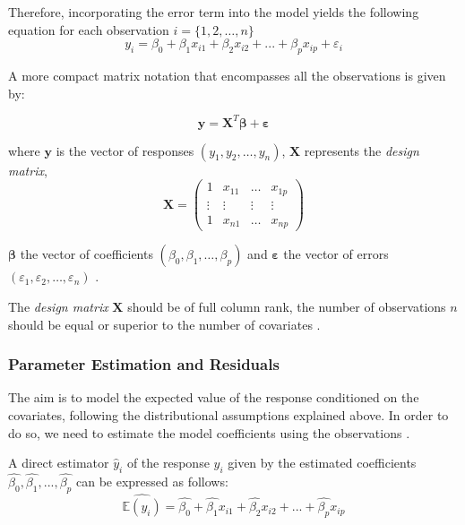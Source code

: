 \documentclass[12 pt]{scrartcl}
\numberwithin{equation}{section}
\begin{document}
Therefore, incorporating the error term into the model yields the following equation for each observation $i=\{1, 2,\hdots,n\}$
\begin{equation}
    y_{i} = \beta_{0} + \beta_{1}x_{i1} + \beta_{2}x_{i2} + ... + \beta_{p}x_{ip} + \varepsilon_{i}
\end{equation}

A more compact matrix notation that encompasses all the observations is given by:

\begin{equation}
    \boldsymbol{y} = \boldsymbol{X}^T\boldsymbol{\beta} + \boldsymbol{\varepsilon}
\end{equation}

where $\boldsymbol{y}$ is the vector of responses $(y_{1}, y_{2},\hdots,y_{n})$,
$\boldsymbol{X}$ represents the \textit{design matrix},
\begin{equation*}
    \boldsymbol{X} = \begin{pmatrix} 
        1 & x_{11} & \dots & x_{1p}\\
        \vdots & \vdots & \vdots & \vdots \\
        1 & x_{n1} & \dots & x_{np} 
        \end{pmatrix}
\end{equation*}

$\boldsymbol{\beta}$ the vector of coefficients $(\beta_{0},\beta_{1},\hdots,\beta_{p})$ 
and $\boldsymbol{\varepsilon}$ the vector of errors $(\varepsilon_{1}, \varepsilon_{2},\hdots,\varepsilon_{n})$ .

    
The \textit{design matrix} $\boldsymbol{X}$ should be of full column rank,
the number of observations $n$ should be equal or superior to the number of covariates \cite[p.75]{regression}.


\subsubsection*{Parameter Estimation and Residuals}
\label{subsubsec:Parameter Estimation and Residuals}

 
The aim is to model the expected value of the response conditioned on the covariates,
following the distributional assumptions explained above. 
In order to do so, we need to estimate the model coefficients using the observations \citep[p.77]{regression}.

A direct estimator $\hat{y}_{i}$ of the response $y_{i}$ given by the estimated coefficients
$\hat{\beta_{0}},\hat{\beta_{1}},...,\hat{\beta_{p}}$ can be expressed as follows:
\begin{equation}
    \widehat{\mathbb{E}(y_{i})} = \hat{\beta_{0}} + \hat{\beta_{1}}x_{i1} + \hat{\beta_{2}}x_{i2} +...+\hat{\beta_{p}}x_{ip}
\end{equation} 
\end{document}
